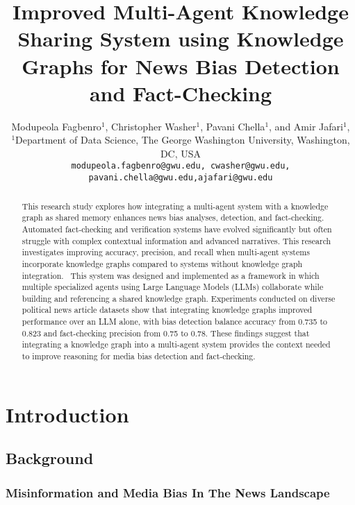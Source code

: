 \documentclass[11pt]{article}
\title{Improved Multi-Agent Knowledge Sharing System using Knowledge Graphs for News Bias Detection and Fact-Checking}
\author{Modupeola Fagbenro$^{1}$, Christopher Washer$^{1}$, Pavani Chella$^{1}$, and Amir Jafari$^{1}$,\\
\small $^{1}$Department of Data Science, The George Washington University, Washington, DC, USA\\
\small \texttt{modupeola.fagbenro@gwu.edu, cwasher@gwu.edu, pavani.chella@gwu.edu,ajafari@gwu.edu}
}
\date{} %
\begin{document}
\maketitle

\begin{abstract}

This research study explores how integrating a multi-agent system with a knowledge graph as shared memory enhances news bias analyses, detection, and fact-checking. Automated fact-checking and verification systems have evolved significantly but often struggle with complex contextual information and advanced narratives. This research investigates improving accuracy, precision, and recall when multi-agent systems incorporate knowledge graphs compared to systems without knowledge graph integration.  This system was designed and implemented as a framework in which multiple specialized agents using Large Language Models (LLMs) collaborate while building and referencing a shared knowledge graph. Experiments conducted on diverse political news article datasets show that integrating knowledge graphs improved performance over an LLM alone, with bias detection balance accuracy from 0.735 to 0.823 and fact-checking precision from 0.75 to 0.78. These findings suggest that integrating a knowledge graph into a multi-agent system provides the context needed to improve reasoning for media bias detection and fact-checking.

  
\end{abstract}

\section{Introduction}
\subsection{Background}

\subsubsection{\textbf{Misinformation and Media Bias In The News Landscape}}
\end{document}
